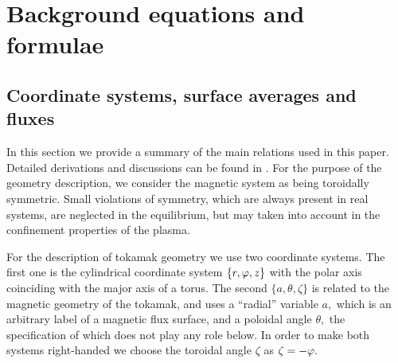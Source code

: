 
\section{Background equations and formulae}

\subsection{Coordinate systems, surface averages and fluxes}

In this section we provide a summary of the main relations used in this
paper. Detailed derivations and discussions can be found in \cite{HH}. 
For the purpose of the geometry description, we consider the magnetic
system as being toroidally symmetric. 
Small violations of symmetry, which are always present in real systems,
are neglected in the equilibrium, but may taken into account in the confinement
properties of the plasma. 

For the description of tokamak geometry we use two coordinate systems.
The first one is the cylindrical coordinate system $\{r,\varphi,z\}$ with
the polar axis coinciding with the major axis of a torus.  
The second $\{a,\theta,\zeta\}$ is related to the magnetic geometry of
the tokamak, and uses a ``radial'' variable $a,$ which is an arbitrary
label of a magnetic flux surface, and a poloidal angle $\theta,$ the
specification of which does not play any role below. 
In order to make both systems right-handed we choose the toroidal angle
$\zeta$ as $\zeta=-\varphi.$ 

